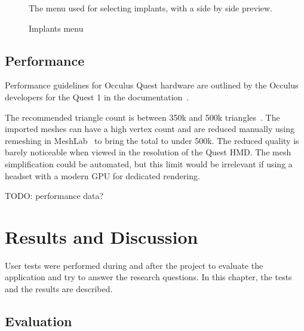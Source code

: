 \documentclass[a4paper]{report}
\begin{document}
\begin{figure}[h!]
    \centering
	\hfill
	\caption{Implants menu}\label{implantsmenu}
  \small
  The menu used for selecting implants, with a side by side preview.
\end{figure}

\section{Performance}
Performance guidelines for Occulus Quest hardware are outlined by the Occulus developers for the Quest 1 in the documentation~\cite{noauthor_oculus_nodate}.

The recommended triangle count is between 350k and 500k triangles~\cite{noauthor_performance_nodate}. The imported meshes can have a high vertex count and are reduced manually using remeshing in MeshLab~\cite{cignoni_meshlab_2008} to bring the total to under 500k. The reduced quality is barely noticeable when viewed in the resolution of the Quest HMD.
The mesh simplification could be automated, but this limit would be irrelevant if using a headset with a modern GPU for dedicated rendering.

TODO: performance data?


\chapter{Results and Discussion}

User tests were performed during and after the project to evaluate the application and try to answer the research questions. In this chapter, the tests and the results are described.

\section{Evaluation}
\end{document}
